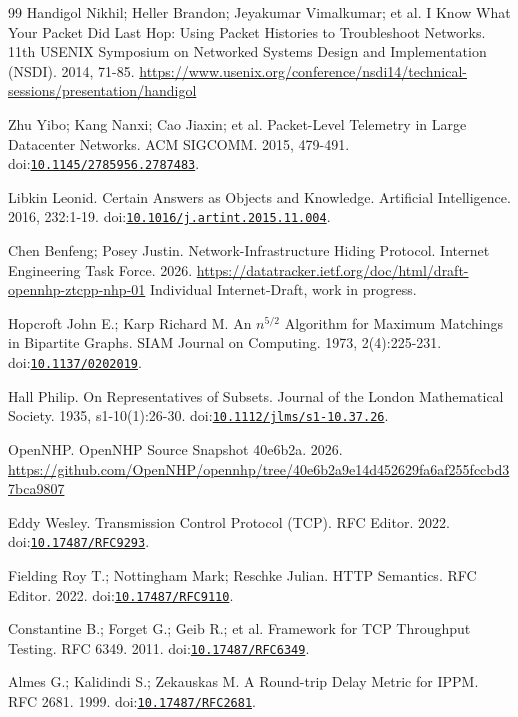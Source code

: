 \begin{thebibliography}{99}
Handigol Nikhil; Heller Brandon; Jeyakumar Vimalkumar; et al. I Know What Your Packet Did Last Hop: Using Packet Histories to Troubleshoot Networks. 11th USENIX Symposium on Networked Systems Design and Implementation (NSDI). 2014, 71-85. \url{https://www.usenix.org/conference/nsdi14/technical-sessions/presentation/handigol}

Zhu Yibo; Kang Nanxi; Cao Jiaxin; et al. Packet-Level Telemetry in Large Datacenter Networks. ACM SIGCOMM. 2015, 479-491. doi:\href{https://doi.org/10.1145/2785956.2787483}{\nolinkurl{10.1145/2785956.2787483}}.

Libkin Leonid. Certain Answers as Objects and Knowledge. Artificial Intelligence. 2016, 232:1-19. doi:\href{https://doi.org/10.1016/j.artint.2015.11.004}{\nolinkurl{10.1016/j.artint.2015.11.004}}.

Chen Benfeng; Posey Justin. Network-Infrastructure Hiding Protocol. Internet Engineering Task Force. 2026. \url{https://datatracker.ietf.org/doc/html/draft-opennhp-ztcpp-nhp-01} Individual Internet-Draft, work in progress.

Hopcroft John E.; Karp Richard M. An $n^{5/2}$ Algorithm for Maximum Matchings in Bipartite Graphs. SIAM Journal on Computing. 1973, 2(4):225-231. doi:\href{https://doi.org/10.1137/0202019}{\nolinkurl{10.1137/0202019}}.

Hall Philip. On Representatives of Subsets. Journal of the London Mathematical Society. 1935, s1-10(1):26-30. doi:\href{https://doi.org/10.1112/jlms/s1-10.37.26}{\nolinkurl{10.1112/jlms/s1-10.37.26}}.

OpenNHP. OpenNHP Source Snapshot 40e6b2a. 2026. \url{https://github.com/OpenNHP/opennhp/tree/40e6b2a9e14d452629fa6af255fccbd37bca9807}

Eddy Wesley. Transmission Control Protocol (TCP). RFC Editor. 2022. doi:\href{https://doi.org/10.17487/RFC9293}{\nolinkurl{10.17487/RFC9293}}.

Fielding Roy T.; Nottingham Mark; Reschke Julian. HTTP Semantics. RFC Editor. 2022. doi:\href{https://doi.org/10.17487/RFC9110}{\nolinkurl{10.17487/RFC9110}}.

Constantine B.; Forget G.; Geib R.; et al. Framework for TCP Throughput Testing. RFC 6349. 2011. doi:\href{https://doi.org/10.17487/RFC6349}{\nolinkurl{10.17487/RFC6349}}.

Almes G.; Kalidindi S.; Zekauskas M. A Round-trip Delay Metric for IPPM. RFC 2681. 1999. doi:\href{https://doi.org/10.17487/RFC2681}{\nolinkurl{10.17487/RFC2681}}.

\end{thebibliography}
